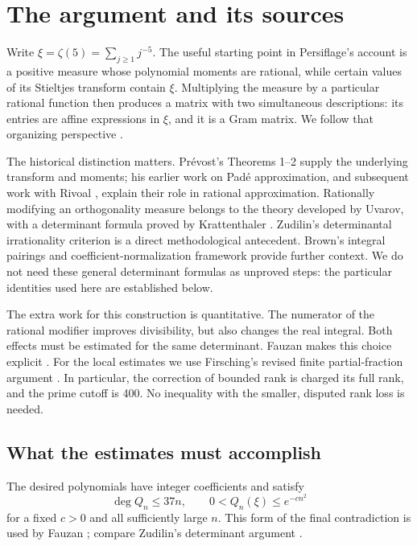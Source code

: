 \section{The argument and its sources}\label{sec:orientation}

Write \(\xi=\zeta(5)=\sum_{j\geq1}j^{-5}\).
The useful starting point in Persiflage's account is a positive measure
whose polynomial moments are rational, while certain values of its
Stieltjes transform contain \(\xi\). Multiplying the measure by a
particular rational function then produces a matrix with two simultaneous
descriptions: its entries are affine expressions in \(\xi\), and it is
a Gram matrix. We follow that organizing perspective
\cite[The formulas of Euler and Hermite; Hankel Determinants]{persiflage}.

The historical distinction matters. Pr\'evost's Theorems 1--2
\cite{prevost} supply the underlying transform and moments; his earlier
work on Pad\'e approximation, and subsequent work with Rivoal
\cite{prevost1996,prevost-rivoal}, explain their role in rational
approximation. Rationally modifying an orthogonality measure belongs to
the theory developed by Uvarov, with a determinant formula proved by
Krattenthaler \cite{uvarov,krattenthaler}. Zudilin's determinantal irrationality
criterion \cite{zudilin} is a direct methodological antecedent.
Brown's integral pairings and coefficient-normalization framework
\cite[Sections 3 and 7.4--7.5]{brown} provide further context.
We do not need these general determinant formulas as unproved steps:
the particular identities used here are established below.

The extra work for this construction is quantitative. The numerator
of the rational modifier improves divisibility, but also changes the
real integral. Both effects must be estimated for the same determinant.
Fauzan makes this choice explicit \cite[Sections 2--6]{fauzan}.
For the local estimates we use Firsching's revised finite
partial-fraction argument \cite{firsching}. In particular, the correction
of bounded rank is charged its full rank, and the prime cutoff is 400.
No inequality with the smaller, disputed rank loss is needed.

\subsection{What the estimates must accomplish}

The desired polynomials have integer coefficients and satisfy
\begin{equation}\label{eq:goal}
 \deg Q_n\leq37n,\qquad
 0<Q_n(\xi)\leq e^{-cn^2}
\end{equation}
for a fixed \(c>0\) and all sufficiently large \(n\).
This form of the final contradiction is used by Fauzan
\cite[Section 1.1]{fauzan}; compare Zudilin's determinant argument
\cite[Section 2]{zudilin}.

